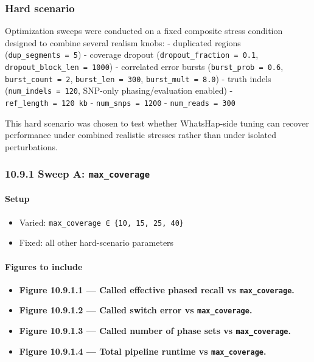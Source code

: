 \documentclass[
]{article}
\providecommand{\tightlist}{%
  \setlength{\itemsep}{0pt}\setlength{\parskip}{0pt}}
\begin{document}
\subsubsection{Hard scenario}\label{hard-scenario}

Optimization sweeps were conducted on a fixed composite stress condition
designed to combine several realism knobs: - duplicated regions
(\texttt{dup\_segments\ =\ 5}) - coverage dropout
(\texttt{dropout\_fraction\ =\ 0.1},
\texttt{dropout\_block\_len\ =\ 1000}) - correlated error bursts
(\texttt{burst\_prob\ =\ 0.6}, \texttt{burst\_count\ =\ 2},
\texttt{burst\_len\ =\ 300}, \texttt{burst\_mult\ =\ 8.0}) - truth
indels (\texttt{num\_indels\ =\ 120}, SNP-only phasing/evaluation
enabled) - \texttt{ref\_length\ =\ 120\ kb} -
\texttt{num\_snps\ =\ 1200} - \texttt{num\_reads\ =\ 300}

This hard scenario was chosen to test whether WhatsHap-side tuning can
recover performance under combined realistic stresses rather than under
isolated perturbations.

\subsubsection{\texorpdfstring{10.9.1 Sweep A:
\texttt{max\_coverage}}{10.9.1 Sweep A: max\_coverage}}\label{sweep-a-max_coverage}

\paragraph{Setup}\label{setup-7}

\begin{itemize}
\tightlist
\item
  Varied: \texttt{max\_coverage\ ∈\ \{10,\ 15,\ 25,\ 40\}}
\item
  Fixed: all other hard-scenario parameters
\end{itemize}

\paragraph{Figures to include}\label{figures-to-include-7}

\begin{itemize}
\tightlist
\item
  \textbf{Figure 10.9.1.1 --- Called effective phased recall vs
  \texttt{max\_coverage}.}
\item
  \textbf{Figure 10.9.1.2 --- Called switch error vs
  \texttt{max\_coverage}.}
\item
  \textbf{Figure 10.9.1.3 --- Called number of phase sets vs
  \texttt{max\_coverage}.}
\item
  \textbf{Figure 10.9.1.4 --- Total pipeline runtime vs
  \texttt{max\_coverage}.}
\end{itemize}
\end{document}
